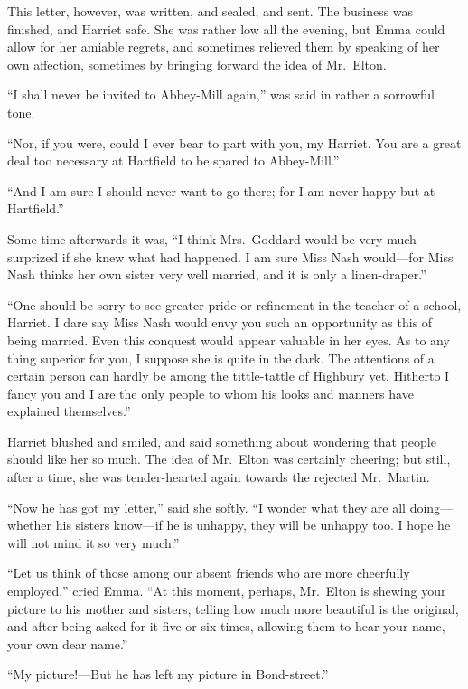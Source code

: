 This letter, however, was written, and sealed, and sent.
The business was finished, and Harriet safe.  She was rather low
all the evening, but Emma could allow for her amiable regrets,
and sometimes relieved them by speaking of her own affection,
sometimes by bringing forward the idea of Mr.\ Elton.

``I shall never be invited to Abbey-Mill again,'' was said in rather
a sorrowful tone.

``Nor, if you were, could I ever bear to part with you, my Harriet.
You are a great deal too necessary at Hartfield to be spared
to Abbey-Mill.''

``And I am sure I should never want to go there; for I am never happy
but at Hartfield.''

Some time afterwards it was, ``I think Mrs.\ Goddard would be very
much surprized if she knew what had happened.  I am sure Miss Nash
would---for Miss Nash thinks her own sister very well married,
and it is only a linen-draper.''

``One should be sorry to see greater pride or refinement in the
teacher of a school, Harriet.  I dare say Miss Nash would envy you
such an opportunity as this of being married.  Even this conquest
would appear valuable in her eyes.  As to any thing superior for you,
I suppose she is quite in the dark.  The attentions of a certain
person can hardly be among the tittle-tattle of Highbury yet.
Hitherto I fancy you and I are the only people to whom his looks
and manners have explained themselves.''

Harriet blushed and smiled, and said something about wondering
that people should like her so much.  The idea of Mr.\ Elton was
certainly cheering; but still, after a time, she was tender-hearted
again towards the rejected Mr.\ Martin.

``Now he has got my letter,'' said she softly.  ``I wonder what they
are all doing---whether his sisters know---if he is unhappy,
they will be unhappy too.  I hope he will not mind it so very much.''

``Let us think of those among our absent friends who are more
cheerfully employed,'' cried Emma.  ``At this moment, perhaps, Mr.\ Elton
is shewing your picture to his mother and sisters, telling how much
more beautiful is the original, and after being asked for it five
or six times, allowing them to hear your name, your own dear name.''

``My picture!---But he has left my picture in Bond-street.''

